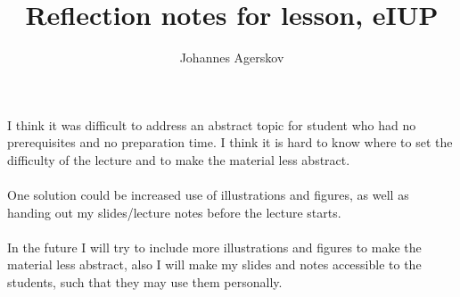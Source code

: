 \documentclass[]{article}
\title{Reflection notes for lesson, eIUP}
\author{Johannes Agerskov}
\begin{document}
\maketitle
I think it was difficult to address an abstract topic for student who had no prerequisites and no preparation time. I think it is hard to know where to set the difficulty of the lecture and to make the material less abstract.\\
\\
One solution could be increased use of illustrations and figures, as well as handing out my slides/lecture notes before the lecture starts.\\
\\
In the future I will try to include more illustrations and figures to make the material less abstract, also I will make my slides and notes accessible to the students, such that they may use them personally. 
\end{document}
